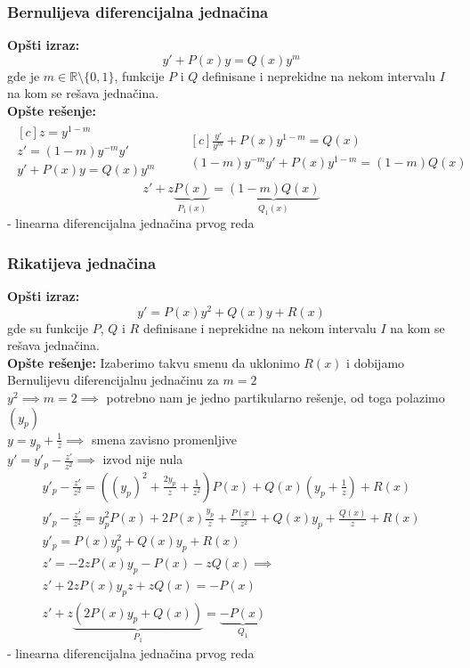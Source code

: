 \subsubsection{Bernulijeva diferencijalna jednačina}
\textbf{Opšti izraz:}
$$y'+P(x)y=Q(x)y^m$$
gde je $m \in \mathbb{R}\setminus \{0,1\}$, funkcije $P$ i $Q$ definisane i neprekidne na nekom intervalu $I$ na kom se rešava jednačina.\\
\textbf{Opšte rešenje:}
\begin{align*}
	\begin{aligned}[c]
		z = y^{1-m}\\
		z' = (1-m)y^{-m}y'\\
		y'+P(x)y=Q(x)y^m
	\end{aligned}
	\quad \quad
	\begin{aligned}[c]
		\frac{y'}{y^m}+P(x)y^{1-m}=Q(x)\\
		(1-m)y^{-m}y' + P(x)y^{1-m}=(1-m)Q(x)
	\end{aligned}
\end{align*}
$$z'+z\underbrace{P(x)}_{P_1(x)}=\underbrace{(1-m)Q(x)}_{Q_1(x)}$$ - linearna diferencijalna jednačina prvog reda

\subsubsection{Rikatijeva jednačina}
\textbf{Opšti izraz:}
$$y' = P(x)y^2+Q(x)y+R(x)$$
gde su funkcije $P$, $Q$ i $R$ definisane i neprekidne na nekom intervalu $I$ na kom se rešava jednačina.\\
\textbf{Opšte rešenje:}
Izaberimo takvu smenu da uklonimo $R(x)$ i dobijamo Bernulijevu diferencijalnu jednačinu za $m=2$\\
$y^2 \implies m= 2 \implies$ potrebno nam je jedno partikularno rešenje, od toga polazimo $(y_p)$\\
$y=y_p+\frac{1}{z} \implies$ smena zavisno promenljive\\
$y' = y'_p - \frac{z'}{z^2} \implies$ izvod nije nula\\
\begin{gather*}
	y'_p - \frac{z'}{z^2} = ((y_p)^2 + \frac{2y_p}{z} + \frac{1}{z^2}) P(x) + Q(x)(y_p + \frac{1}{z}) + R(x)\\
	y'_p - \frac{z'}{z^2} = y_p^2 P(x) + 2P(x)\frac{y_p}{z} + \frac{P(x)}{z^2} + Q(x)y_p + \frac{Q(x)}{z} + R(x)\\
	y'_p = P(x)y_p^2 + Q(x)y_p + R(x)\\
	z' = -2zP(x)y_p - P(x) - zQ(x) \implies\\
	z' + 2zP(x)y_pz+zQ(x)= -P(x)\\
	z' + z\underbrace{(2P(x)y_p+Q(x))}_{P_1} = \underbrace{-P(x)}_{Q_1}
\end{gather*} 
- linearna diferencijalna jednačina prvog reda

